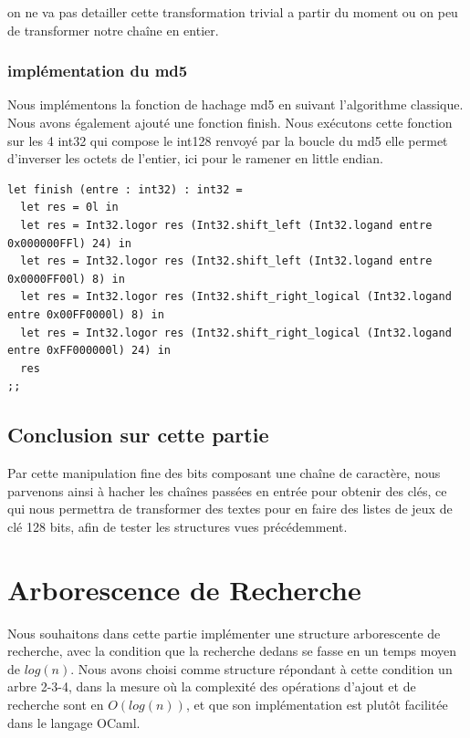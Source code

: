 \documentclass[12pt,a4paper]{article}
\begin{document}
    
    on ne va pas detailler cette transformation trivial a partir du moment ou on peu de transformer notre chaîne en entier.


    \subsubsection{implémentation du md5}
    
    Nous implémentons la fonction de hachage md5 en suivant l'algorithme classique. Nous avons également ajouté une fonction finish. Nous exécutons cette fonction sur les 4 int32 qui compose le int128 renvoyé par la boucle du md5 elle permet d'inverser les octets de l'entier, ici pour le ramener en little endian.
    
\bigskip \begin{lstlisting}
let finish (entre : int32) : int32 =
  let res = 0l in
  let res = Int32.logor res (Int32.shift_left (Int32.logand entre 0x000000FFl) 24) in 
  let res = Int32.logor res (Int32.shift_left (Int32.logand entre 0x0000FF00l) 8) in 
  let res = Int32.logor res (Int32.shift_right_logical (Int32.logand entre 0x00FF0000l) 8) in 
  let res = Int32.logor res (Int32.shift_right_logical (Int32.logand entre 0xFF000000l) 24) in 
  res
;;
\end{lstlisting} \bigskip 

    
\subsection{Conclusion sur cette partie}

Par cette manipulation fine des bits composant une chaîne de caractère, nous parvenons ainsi à hacher les chaînes passées en entrée pour obtenir des clés, ce qui nous permettra de transformer des textes pour en faire des listes de jeux de clé 128 bits, afin de tester les structures vues précédemment.

\newpage
 \section{Arborescence de Recherche}


Nous souhaitons dans cette partie implémenter une structure arborescente de recherche, avec la condition que la recherche dedans se fasse en un temps moyen de $log(n)$. Nous avons choisi comme structure répondant à cette condition un arbre 2-3-4\cite{234tree}, dans la mesure où la complexité des opérations d'ajout et de recherche sont en $O(log (n))$, et que son implémentation est plutôt facilitée dans le langage OCaml. 
\end{document}
